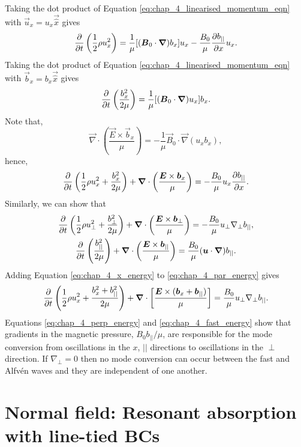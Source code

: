 Taking the dot product of Equation \eqref{eq:chap_4_linearised_momentum_eqn} with $\vec{u}_x=u_x\vec{\hat{x}}$ gives
\[\pdv{}{t}\left(\frac{1}{2}\rho u_x^2\right)=\frac{1}{\mu}[(\boldsymbol{B}_0\cdot\boldsymbol{\nabla})b_x]u_x-\frac{B_0}{\mu}\pdv{b_{||}}{x}u_x.\]
Taking the dot product of Equation \eqref{eq:chap_4_linearised_momentum_eqn} with $\vec{b}_x=b_x\vec{\hat{x}}$ gives
\[\pdv{}{t}\left(\frac{b_x^2}{2\mu}\right)=\frac{1}{\mu}[(\boldsymbol{B}_0\cdot\boldsymbol{\nabla})u_x]b_x.\]
Note that,
\[\vec{\nabla}\cdot\left(\frac{\vec{E}\times\vec{b}_x}{\mu}\right)=-\frac{1}{\mu}\vec{B}_0\cdot\vec{\nabla}(u_xb_x),\]
hence,
\begin{equation}
    \label{eq:chap_4_x_energy}
    \pdv{}{t}\left(\frac{1}{2}\rho u_x^2+\frac{b_x^2}{2\mu}\right)+\boldsymbol{\nabla}\cdot\left(\frac{\boldsymbol{E}\times\boldsymbol{b}_x}{\mu}\right)=-\frac{B_0}{\mu}u_x\pdv{b_{||}}{x}.
\end{equation}
Similarly, we can show that
\begin{gather}
    \label{eq:chap_4_perp_energy}
    \pdv{}{t}\left(\frac{1}{2}\rho u_\perp^2+\frac{b_\perp^2}{2\mu}\right)+\boldsymbol{\nabla}\cdot\left(\frac{\boldsymbol{E}\times\boldsymbol{b}_\perp}{\mu}\right)=-\frac{B_0}{\mu}u_\perp\nabla_\perp b_{||}, \\
    \label{eq:chap_4_par_energy}
    \pdv{}{t}\left(\frac{b_{||}^2}{2\mu}\right)+\boldsymbol{\nabla}\cdot\left(\frac{\boldsymbol{E}\times\boldsymbol{b}_{||}}{\mu}\right)=\frac{B_0}{\mu}(\boldsymbol{u}\cdot\boldsymbol{\nabla})b_{||}.
\end{gather}
Adding Equation \eqref{eq:chap_4_x_energy} to \eqref{eq:chap_4_par_energy} gives
\begin{equation}
    \label{eq:chap_4_fast_energy}
    \pdv{}{t}\left(\frac{1}{2}\rho u_x^2+\frac{b_x^2+b_{||}^2}{2\mu}\right)+\boldsymbol{\nabla}\cdot\left[\frac{\boldsymbol{E}\times(\boldsymbol{b}_x+\boldsymbol{b}_{||})}{\mu}\right]=\frac{B_0}{\mu}u_\perp\nabla_\perp b_{||}.
\end{equation}
Equations \eqref{eq:chap_4_perp_energy} and \eqref{eq:chap_4_fast_energy} show that gradients in the magnetic pressure, $B_0b_{||}/\mu$, are responsible for the mode conversion from oscillations in the $x$, $||$ directions to oscillations in the $\perp$ direction. If $\nabla_\perp = 0$ then no mode conversion can occur between the fast and Alfv\'en waves and they are independent of one another.

\section{Normal field: Resonant absorption with line-tied BCs}
\label{sec:normal_field_resonant_absorption_with_line_tied_bcs}

